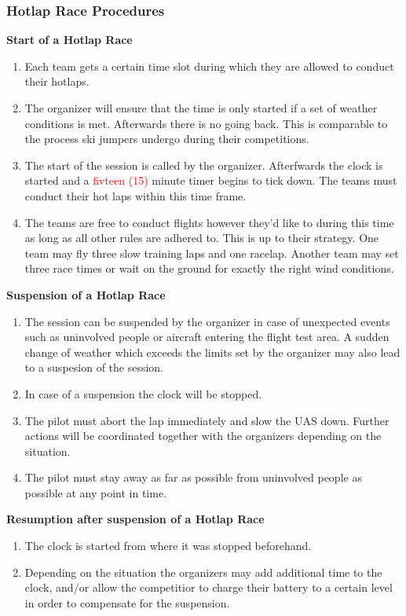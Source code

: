     \subsubsection{Hotlap Race Procedures}
    \textbf{Start of a Hotlap Race}
    \begin{enumerate}
      \item Each team gets a certain time slot during which they are allowed to conduct their hotlaps. 
      \item The organizer will ensure that the time is only started if a set of weather conditions is met. Afterwards there is no going back. This is comparable to the process ski jumpers undergo during their competitions.
      \item The start of the session is called by the organizer. Afterfwards the clock is started and a \textcolor{red}{fivteen (15)} minute timer begins to tick down. The teams must conduct their hot laps within this time frame.
      \item The teams are free to conduct flights however they'd like to during this time as long as all other rules are adhered to. This is up to their strategy. One team may fly three slow training laps and one racelap. Another team may set three race times or wait on the ground for exactly the right wind conditions.
    \end{enumerate}
    \textbf{Suspension of a Hotlap Race}
    \begin{enumerate}[resume]
      \item The session can be suspended by the organizer in case of unexpected events such as uninvolved people or aircraft entering the flight test area. A sudden change of weather which exceeds the limits set by the organizer may also lead to a suspesion of the session. 
      \item In case of a suspension the clock will be stopped. 
      \item The pilot must abort the lap immediately and slow the UAS down. Further actions will be coordinated together with the organizers depending on the situation.
      \item The pilot must stay away as far as possible from uninvolved people as possible at any point in time. 
    \end{enumerate}

    \textbf{Resumption after suspension of a Hotlap Race}
    \begin{enumerate}[resume]
      \item The clock is started from where it was stopped beforehand.
      \item Depending on the situation the organizers may add additional time to the clock, and/or allow the competitior to charge their battery to a certain level in order to compensate for the suspension.
    \end{enumerate}

